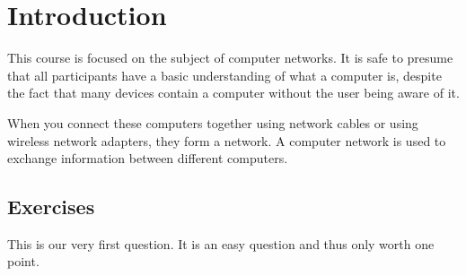 \chapter{Introduction}
\label{chap:introduction}

This course is focused on the subject of computer networks.
It is safe to presume that all participants have a basic understanding of what a computer is, despite the fact that many devices contain a computer without the user being aware of it.
    
When you connect these computers together using network cables or using wireless network adapters, they form a network.
A computer network is used to exchange information between different computers.


\section{Exercises}

\begin{exercise}
This is our very first question.
It is an easy question and thus only worth one point.
\end{exercise}